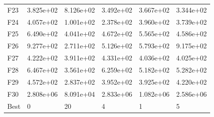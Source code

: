 \begin{tabular}{llllll}
F23  &  3.825e+02 &  8.126e+02 &  3.492e+02 &  3.667e+02 &  3.344e+02 \\
F24  &  4.057e+02 &  1.001e+02 &  2.378e+02 &  3.960e+02 &  3.739e+02 \\
F25  &  6.490e+02 &  4.041e+02 &  4.672e+02 &  5.565e+02 &  4.586e+02 \\
F26  &  9.277e+02 &  2.711e+02 &  5.126e+02 &  5.793e+02 &  9.175e+02 \\
F27  &  4.222e+02 &  3.911e+02 &  4.331e+02 &  4.036e+02 &  4.025e+02 \\
F28  &  6.467e+02 &  3.561e+02 &  6.259e+02 &  5.182e+02 &  5.282e+02 \\
F29  &  4.572e+02 &  2.837e+02 &  3.952e+02 &  3.925e+02 &  4.220e+02 \\
F30  &  2.808e+06 &  8.091e+04 &  2.833e+06 &  1.082e+06 &  2.586e+06 \\
Best &          0 &         20 &          4 &          1 &          5 \\
\bottomrule
\end{tabular}
